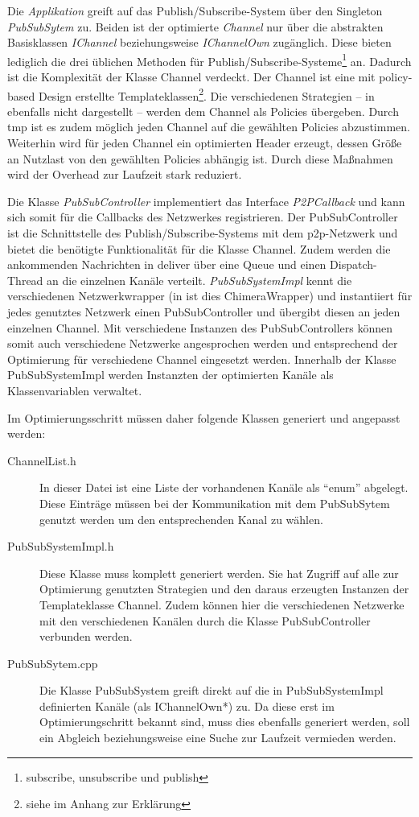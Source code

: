 Die \emph{Applikation} greift auf das Publish/Subscribe-System über den Singleton \emph{PubSubSytem} zu. Beiden ist der optimierte \emph{Channel} nur über die abstrakten Basisklassen \emph{IChannel} beziehungsweise \emph{IChannelOwn} zugänglich. Diese bieten lediglich die drei üblichen Methoden für Publish/Subscribe-Systeme\footnote{subscribe, unsubscribe und publish} an. Dadurch ist die Komplexität der Klasse Channel verdeckt. Der Channel ist eine mit policy-based Design erstellte Templateklassen\footnote{siehe  im Anhang zur Erklärung}. Die verschiedenen Strategien -- in  ebenfalls nicht dargestellt -- werden dem Channel als Policies übergeben. Durch \ac{tmp} ist es zudem möglich jeden Channel auf die gewählten Policies abzustimmen. Weiterhin wird für jeden Channel ein optimierten Header erzeugt, dessen Größe an Nutzlast von den gewählten Policies abhängig ist. Durch diese Maßnahmen wird der Overhead zur Laufzeit stark reduziert. 

Die Klasse \emph{PubSubController} implementiert das Interface \emph{P2PCallback} und kann sich somit für die Callbacks des Netzwerkes registrieren. Der PubSubController ist die Schnittstelle des Publish/Subscribe-Systems mit dem \ac{p2p}-Netzwerk und bietet die benötigte Funktionalität für die Klasse Channel. Zudem werden die ankommenden Nachrichten in deliver über eine Queue und einen Dispatch-Thread an die einzelnen Kanäle verteilt. \emph{PubSubSystemImpl} kennt die verschiedenen Netzwerkwrapper (in  ist dies ChimeraWrapper) und instantiiert für jedes genutztes Netzwerk einen PubSubController und übergibt diesen an jeden einzelnen Channel. Mit verschiedene Instanzen des PubSubControllers können somit auch verschiedene Netzwerke angesprochen werden und entsprechend der Optimierung für verschiedene Channel eingesetzt werden. Innerhalb der Klasse PubSubSystemImpl werden Instanzten der optimierten Kanäle als Klassenvariablen verwaltet.

Im Optimierungsschritt müssen daher folgende Klassen generiert und angepasst werden:
\begin{description}
\item[ChannelList.h] In dieser Datei ist eine Liste der vorhandenen Kanäle als ``enum'' abgelegt. Diese Einträge müssen bei der Kommunikation mit dem PubSubSytem genutzt werden um den entsprechenden Kanal zu wählen.
\item[PubSubSystemImpl.h] Diese Klasse muss komplett generiert werden. Sie hat Zugriff auf alle zur Optimierung genutzten Strategien und den daraus erzeugten Instanzen der Templateklasse Channel. Zudem können hier die verschiedenen Netzwerke mit den verschiedenen Kanälen durch die Klasse PubSubController verbunden werden. 
\item[PubSubSytem.cpp] Die Klasse PubSubSystem greift direkt auf die in PubSubSystemImpl definierten Kanäle (als IChannelOwn*) zu. Da diese erst im Optimierungschritt bekannt sind, muss dies ebenfalls generiert werden, soll ein Abgleich beziehungsweise eine Suche zur Laufzeit vermieden werden.
\end{description}




